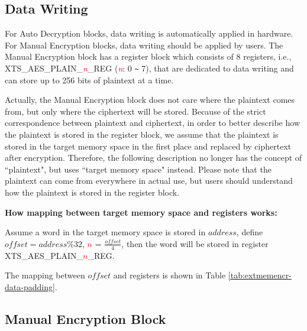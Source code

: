 \documentclass[main\_\_EN.tex]{subfiles}
\begin{document}
\subsection{Data Writing} 
\label{sec:extmemncr-data-writing}

For Auto Decryption blocks, data writing is automatically applied in hardware. For Manual Encryption blocks, data writing should be applied by users. The Manual Encryption block has a register block which consists of 8 registers, i.e., XTS\_AES\_PLAIN\_\textcolor{red}{\it{n}}\_REG (\textcolor{red}{\it{n}}: 0 \verb+~+ 7), that are dedicated to data writing and can store up to 256 bits of plaintext at a time.

Actually, the Manual Encryption block does not care where the plaintext comes from, but only where the ciphertext will be stored. Because of the strict correspondence between plaintext and ciphertext, in order to better describe how the plaintext is stored in the register block, we assume that the plaintext is stored in the target memory space in the first place and replaced by ciphertext after encryption. Therefore, the following description no longer has the concept of ``plaintext", but uses ``target memory space" instead. Please note that the plaintext can come from everywhere in actual use, but users should understand how the plaintext is stored in the register block.

{\bfseries How mapping between target memory space and registers works:}

Assume a word in the target memory space is stored in \begin{math} address \end{math}, define \begin{math} offset = address \% 32 \end{math}, \textcolor{red}{\it{$n$}} =  \begin{math} \frac{offset}{4} \end{math}, then the word will be stored in register XTS\_AES\_PLAIN\_\textcolor{red}{\it{$n$}}\_REG.

The mapping between \begin{math} offset \end{math} and registers is shown in Table \ref{tab:extmemencr-data-padding}.



\subsection{Manual Encryption Block}
\end{document}
